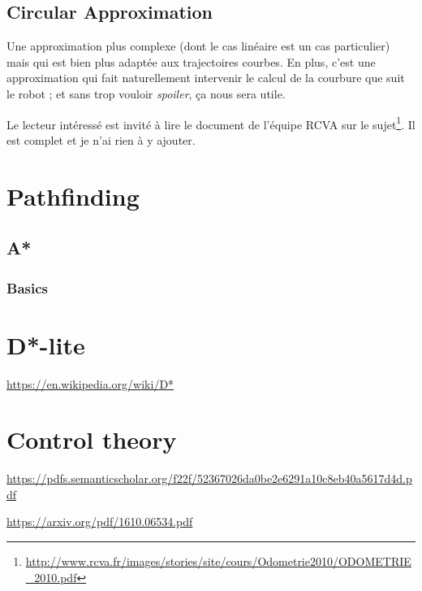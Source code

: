 \documentclass[11pt]{article}
\begin{document}
    \subsection{Circular Approximation}\label{subsec:circularApproximation}

    Une approximation plus complexe (dont le cas linéaire est un cas particulier) mais qui est bien plus adaptée aux trajectoires courbes. En plus, c'est une approximation qui fait naturellement intervenir le calcul de la courbure que suit le robot ; et sans trop vouloir \textit{spoiler}, ça nous sera utile.

    Le lecteur intéressé est invité à lire le document de l'équipe RCVA sur le sujet\cite{odorcva}\footnote{\url{http://www.rcva.fr/images/stories/site/cours/Odometrie2010/ODOMETRIE\_2010.pdf}}. Il est complet et je n'ai rien à y ajouter.



    \section{Pathfinding}\label{sec:pathfinding}

    \subsection{A*}\label{subsec:a*}
    \subsubsection{Basics}

    \section{D*-lite}\label{sec:d*-lite}
    
    
    \href{https://en.wikipedia.org/wiki/D*}{https://en.wikipedia.org/wiki/D*}

    \section{Control theory}\label{sec:controlTheory}

    \href{https://pdfs.semanticscholar.org/f22f/52367026da0be2e6291a10c8eb40a5617d4d.pdf}{https://pdfs.semanticscholar.org/f22f/52367026da0be2e6291a10c8eb40a5617d4d.pdf}

    \href{https://arxiv.org/pdf/1610.06534.pdf}{https://arxiv.org/pdf/1610.06534.pdf}
\end{document}
